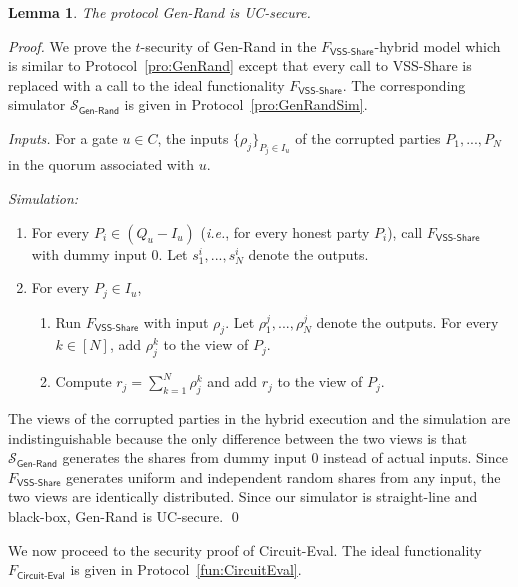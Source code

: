 \documentclass[11pt,letter]{article}
\newcommand{\ie}{\emph{i.e.}}
\newcommand{\alg}[1]{\mbox{\textsf{#1}}}
\newcommand{\func}[1]{\mbox{$F_\textsf{#1}$}}
\newcommand{\simu}[1]{\mbox{$\mathcal{S}_\textsf{#1}$}}
\theoremstyle{mytheoremstyle}
\newtheorem{lemma}{Lemma}
\let\savedCaption=\caption
\renewcommand*{\caption}[1]{\savedCaption[#1]{~#1}}
\newcommand{\algfont}{}
\begin{document}
\begin{lemma}
	The protocol \alg{Gen-Rand} is UC-secure.
\end{lemma}
\begin{proof}	
	We prove the $t$-security of \alg{Gen-Rand} in the \func{VSS-Share}-hybrid model which is similar to Protocol~\ref{pro:GenRand} except that every call to \alg{VSS-Share} is replaced with a call to the ideal functionality \func{VSS-Share}. The corresponding simulator \simu{Gen-Rand} is given in Protocol~\ref{pro:GenRandSim}.	
	\begin{algorithm}
		\algfont
		\caption{\simu{Gen-Rand}}
		\label{pro:GenRandSim}
		
		\textit{Inputs.} For a gate $u \in C$, the inputs $\{\rho_j\}_{P_j \in I_u}$ of the corrupted parties $P_1,...,P_N$ in the quorum associated with $u$.
\medskip
		
		\textit{Simulation:}
		
		\begin{enumerate}
			\item For every \mbox{$P_i \in (Q_u - I_u)$} (\ie, for every honest party $P_i$), call \func{VSS-Share} with dummy input 0. Let $s^i_1,...,s^i_N$ denote the outputs.
			\item For every $P_j \in I_u$, 
			\begin{enumerate}
				\item Run \func{VSS-Share} with input $\rho_j$. Let $\rho^j_1,...,\rho^j_N$ denote the outputs. For every $k \in [N]$, add $\rho^k_j$ to the view of $P_j$.
				\item Compute $r_j=\sum_{k=1}^{N}\rho^k_j$ and add $r_j$ to the view of $P_j$.
			\end{enumerate}
		\end{enumerate}
	\end{algorithm}
	
	The views of the corrupted parties in the hybrid execution and the simulation are indistinguishable because the only difference between the two views is that \simu{Gen-Rand} generates the shares from dummy input 0 instead of actual inputs. Since \func{VSS-Share} generates uniform and independent random shares from any input, the two views are identically distributed.	
	Since our simulator is straight-line and black-box, \alg{Gen-Rand} is UC-secure.
	\qed
\end{proof}

We now proceed to the security proof of \alg{Circuit-Eval}. The ideal functionality \func{Circuit-Eval} is given in Protocol~\ref{fun:CircuitEval}.
\end{document}
